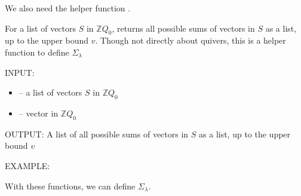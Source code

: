 \documentclass[letterpaper,10pt,english]{sphinxmanual}
\begin{document}
\sphinxAtStartPar
We also need the helper function .

\begin{fulllineitems}
\label{\detokenize{index:quivercombinatorics.N_set}}
\pysigstartsignatures
\pysiglinewithargsret
{}
{\sphinxparamcomma {}}
{}
\pysigstopsignatures
\sphinxAtStartPar
For a list of vectors \(S\) in \(\mathbb{Z}Q_0\), returns all possible sums of vectors in \(S\) as a list, up to the upper bound \(v\). Though not directly about quivers, this is a helper function to define \(\Sigma_\lambda\)

\sphinxAtStartPar
INPUT:
\begin{itemize}
\item {} 
\sphinxAtStartPar
{} – a list of vectors \(S\) in \(\mathbb{Z}Q_0\)

\item {} 
\sphinxAtStartPar
{} – vector in \(\mathbb{Z}Q_0\)

\end{itemize}

\sphinxAtStartPar
OUTPUT: A list of all possible sums of vectors in \(S\) as a list, up to the upper bound \(v\)

\sphinxAtStartPar
EXAMPLE:

\begin{sphinxVerbatim}[commandchars=\\\{\}]
  
 \PYG{p}{[}\PYG{p}{[} \PYG{p}{]}\PYG{p}{]}\PYG{p}{[} \PYG{p}{]}
\PYG{p}{[}     \PYG{p}{]}
\end{sphinxVerbatim}

\end{fulllineitems}


\sphinxAtStartPar
With these functions, we can define \(\Sigma_{\lambda}\).
\end{document}
